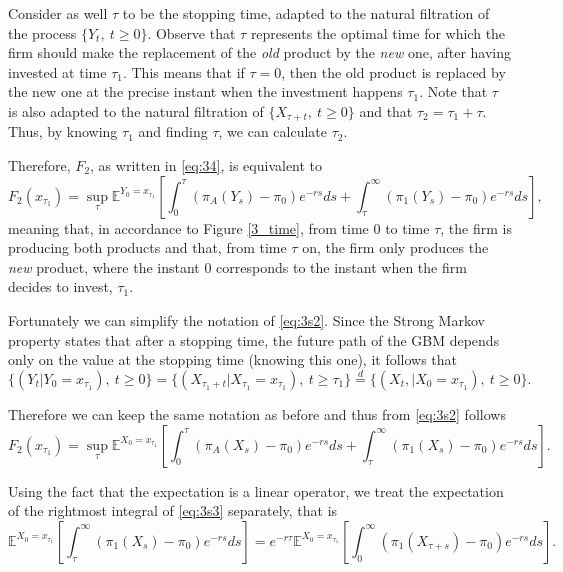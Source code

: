 Consider as well $\tau$ to be the stopping time, adapted to the natural filtration of the process $\{Y_t, \ t\geq0\}$. Observe that $\tau$ represents the optimal time for which the firm should make the replacement of the \textit{old} product by the \textit{new} one, after having invested at time $\tau_1$. This means that  if $\tau=0$, then the old product is replaced by the new one at the precise instant when the investment happens $\tau_1$. Note that $\tau$ is also adapted to the natural filtration of $\{ X_{\tau+t},\ t\geq0 \}$ and that $\tau_2=\tau_1+\tau$. Thus, by knowing $\tau_1$ and finding $\tau$, we can calculate $\tau_2$.

Therefore, $F_2$, as written in \eqref{eq:34}, is equivalent to
\begin{equation}
F_2(x_{\tau_1})=\sup_{\tau} \mathds{E}^{Y_0=x_{\tau_1}} \left[ \int_0^{\tau} \left( \pi_A(Y_s)-\pi_0 \right) e^{-rs}ds + \int_{\tau}^\infty \left( \pi_1(Y_s)-\pi_0 \right) e^{-rs}ds  \right],
\label{eq:3s2}
\end{equation}
meaning that, in accordance to Figure \ref{3_time}, from time 0 to time $\tau$, the firm is producing both products and that, from time $\tau$ on, the firm only produces the \textit{new} product, where the instant 0 corresponds to the instant when the firm decides to invest, $\tau_1$.

Fortunately we can simplify the notation of \eqref{eq:3s2}. Since the Strong Markov property states that after a stopping time, the future path of the GBM depends only on the value at the stopping time (knowing this one), it follows that 
$$\{(Y_t | Y_0=x_{\tau_1}), \ t\geq0 \} = \{(X_{\tau_1+t} | X_{\tau_1}=x_{\tau_1}),\ t\geq \tau_1 \} \overset{d}{=}  \{(X_{t}, | X_0=x_{\tau_1}), \ t\geq0 \}. $$

Therefore we can keep the same notation as before and thus from \eqref{eq:3s2} follows
\begin{equation}
F_2(x_{\tau_1})=\sup_{\tau} \mathds{E}^{X_0=x_{\tau_1}} \left[ \int_0^{\tau} \left( \pi_A(X_s)-\pi_0 \right) e^{-rs}ds + \int_{\tau}^\infty \left( \pi_1(X_s)-\pi_0 \right) e^{-rs}ds  \right].
\label{eq:3s3}
\end{equation}


Using the fact that the expectation is a linear operator, we treat the expectation of the rightmost integral of \eqref{eq:3s3} separately, that is
\begin{equation}
\mathds{E}^{X_0=x_{\tau_1}} \left[  \int_{\tau}^\infty \left( \pi_1(X_s)-\pi_0 \right) e^{-rs}ds  \right] =  e^{-r\tau} \mathds{E}^{X_0=x_{\tau_1}} \left[  \int_{0}^\infty \left( \pi_1(X_{\tau+s})-\pi_0 \right) e^{-rs}ds  \right].
\label{eq:3s4}
\end{equation}


